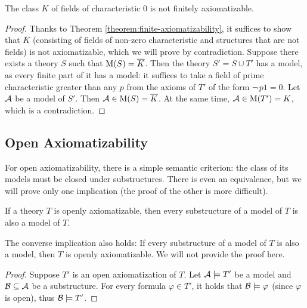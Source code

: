 \begin{proposition}
The class $K$ of fields of characteristic $0$ is not finitely axiomatizable.   
\end{proposition}
\begin{proof}
Thanks to Theorem \ref{theorem:finite-axiomatizability}, it suffices to show that $\overline{K}$ (consisting of fields of non-zero characteristic and structures that are not fields) is not axiomatizable, which we will prove by contradiction. Suppose there exists a theory $S$ such that $\operatorname{M}(S) = \overline{K}$. Then the theory 
$S' = S \cup T'$ has a model, as every finite part of it has a model: it suffices to take a field of prime characteristic greater than any $p$ from the axioms of $T'$ of the form $\neg\, p1 = 0$. Let $\mathcal{A}$ be a model of $S'$. Then $\mathcal{A} \in \operatorname{M}(S) = \overline{K}$. At the same time, $\mathcal{A} \in \operatorname{M}(T') = K$, which is a contradiction.
\end{proof}

\subsection{Open Axiomatizability}

For open axiomatizability, there is a simple semantic criterion: the class of its models must be closed under substructures. There is even an equivalence, but we will prove only one implication (the proof of the other is more difficult).

\begin{theorem}\label{theorem:open-axiomatizability}
If a theory $T$ is openly axiomatizable, then every substructure of a model of $T$ is also a model of $T$.   
\end{theorem}

\begin{remark}
    The converse implication also holds: If every substructure of a model of $T$ is also a model, then $T$ is openly axiomatizable. We will not provide the proof here.
\end{remark}

\begin{proof}
Suppose $T'$ is an open axiomatization of $T$. Let $\mathcal{A} \models T'$ be a model and $\mathcal{B} \subseteq \mathcal{A}$ be a substructure. For every formula $\varphi \in T'$, it holds that $\mathcal{B} \models \varphi$ (since $\varphi$ is open), thus $\mathcal{B} \models T'$.  
\end{proof}

